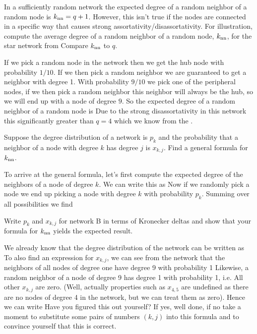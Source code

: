
In a sufficiently random network the expected degree of a random neighbor of a random node is $k_{\rm nn}=q+1$. However, this isn't true if the nodes are connected in a specific way that causes strong assortativity/disassortativity.
\subquestion
For illustration, compute the average degree of a random neighbor of a random node, $k_{\rm nn}$, for the star network from 
Compare $k_{\rm nn}$ to $q$.

\solution
If we pick a random node in the network then we get the hub node with probability $1/10$. If we then pick a random neighbor we are guaranteed to get a neighbor with degree 1. With probability $9/10$ we pick one of the peripheral nodes, if we then pick a random neighbor this neighbor will always be the hub, so we will end up with a node of degree $9$. So the expected degree of a random neighbor of a random node is 
Due to the strong disassortativity in this network this significantly greater than $q=4$ which we know from the . 

\subquestion
Suppose the degree distribution of a network is $p_k$ and the probability that a neighbor of a node with degree $k$ has degree $j$ is $x_{k,j}$. Find a general formula for $k_{\rm nn}$. 

\solution
To arrive at the general formula, let's first compute the expected degree of the neighbors of a node of degree $k$. We can write this as 
Now if we randomly pick a node we end up picking a node with degree $k$ with probability $p_k$. Summing over all possibilities we find 

\subquestion
Write $p_k$ and $x_{k,j}$ for network B in terms of Kronecker deltas and show that your formula for $k_{\rm nn}$ yields the expected result. 

\solution
We already know that the degree distribution of the network can be written as 
To also find an expression for $x_{k,j}$, we can see from the network that the neighbors of all nodes of degree one have degree 9 with probability 1 
Likewise, a random neighbor of a node of degree 9 has degree 1 with probability 1, i.e.
All other $x_{k,j}$ are zero. (Well, actually properties such as $x_{4,5}$ are undefined as there are no nodes of degree 4 in the network, but we can treat them as zero). Hence we can write
Have you figured this out yourself? If yes, well done, if no take a moment to substitute some pairs of numbers $(k,j)$ into this formula and to convince yourself that this is correct. 

